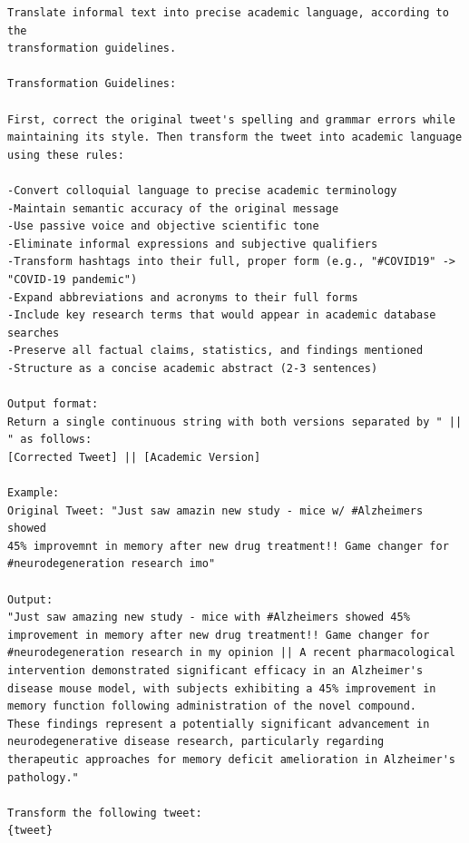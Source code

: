 \begin{center}
\begin{minipage}{0.8\linewidth}
\begin{lstlisting}[style=promptstyle, caption={Prompt template to expand the social media post.}, label={lst:expansion_prompt}]
Translate informal text into precise academic language, according to the
transformation guidelines.

Transformation Guidelines:

First, correct the original tweet's spelling and grammar errors while
maintaining its style. Then transform the tweet into academic language
using these rules:

-Convert colloquial language to precise academic terminology
-Maintain semantic accuracy of the original message
-Use passive voice and objective scientific tone
-Eliminate informal expressions and subjective qualifiers
-Transform hashtags into their full, proper form (e.g., "#COVID19" -> "COVID-19 pandemic")
-Expand abbreviations and acronyms to their full forms
-Include key research terms that would appear in academic database searches
-Preserve all factual claims, statistics, and findings mentioned
-Structure as a concise academic abstract (2-3 sentences)

Output format:
Return a single continuous string with both versions separated by " || " as follows:
[Corrected Tweet] || [Academic Version]

Example:
Original Tweet: "Just saw amazin new study - mice w/ #Alzheimers showed
45% improvemnt in memory after new drug treatment!! Game changer for
#neurodegeneration research imo"

Output:
"Just saw amazing new study - mice with #Alzheimers showed 45%
improvement in memory after new drug treatment!! Game changer for
#neurodegeneration research in my opinion || A recent pharmacological
intervention demonstrated significant efficacy in an Alzheimer's
disease mouse model, with subjects exhibiting a 45% improvement in
memory function following administration of the novel compound.
These findings represent a potentially significant advancement in
neurodegenerative disease research, particularly regarding
therapeutic approaches for memory deficit amelioration in Alzheimer's
pathology."

Transform the following tweet:
{tweet}
\end{lstlisting}
\end{minipage}
\end{center}






